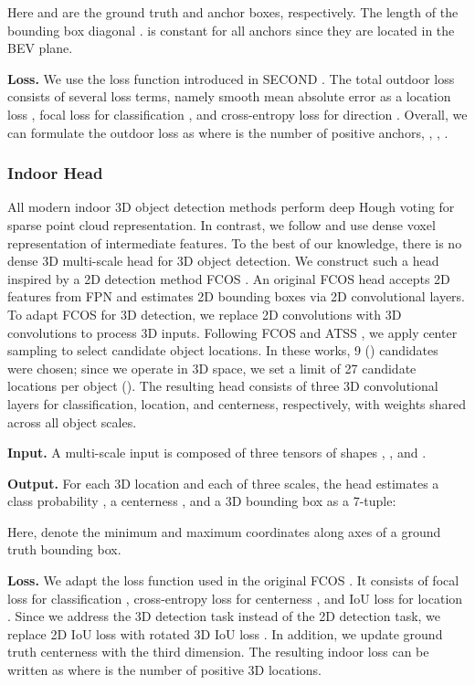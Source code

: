 \documentclass[10pt,twocolumn,letterpaper]{article}
\begin{document}
Here  and  are the ground truth and anchor boxes, respectively. The length of the bounding box diagonal .  is constant for all anchors since they are located in the BEV plane.

\textbf{Loss.} We use the loss function introduced in SECOND \cite{yan2018second}. The total outdoor loss consists of several loss terms, namely smooth mean absolute error as a location loss , focal loss for classification , and cross-entropy loss for direction . Overall, we can formulate the outdoor loss as 
where  is the number of positive anchors, , , .

\subsubsection{Indoor Head} \label{sec:indoor}

All modern indoor 3D object detection methods \cite{qi2019votenet, qi2020imvotenet, zhang2020h3dnet} perform deep Hough voting for sparse point cloud representation. In contrast, we follow \cite{murez2020atlas, hou20193dsis} and use dense voxel representation of intermediate features. To the best of our knowledge, there is no dense 3D multi-scale head for 3D object detection. We construct such a head inspired by a 2D detection method FCOS \cite{tian2019fcos}. An original FCOS head accepts 2D features from FPN and estimates 2D bounding boxes via 2D convolutional layers. To adapt FCOS for 3D detection, we replace 2D convolutions with 3D convolutions to process 3D inputs. Following FCOS and ATSS \cite{zhang2020atss}, we apply center sampling to select candidate object locations. In these works, 9 () candidates were chosen; since we operate in 3D space, we set a limit of 27 candidate locations per object (). The resulting head consists of three 3D convolutional layers for classification, location, and centerness, respectively, with weights shared across all object scales.

\textbf{Input.} A multi-scale input is composed of three tensors of shapes , , and . 

\textbf{Output.} For each 3D location  and each of three scales, the head estimates a class probability , a centerness , and a 3D bounding box as a 7-tuple:



Here,  denote the minimum and maximum coordinates along axes of a ground truth bounding box.

\textbf{Loss.} We adapt the loss function used in the original FCOS \cite{tian2019fcos}. It consists of focal loss for classification , cross-entropy loss for centerness , and IoU loss for location . Since we address the 3D detection task instead of the 2D detection task, we replace 2D IoU loss with rotated 3D IoU loss \cite{zhou2019iou}. In addition, we update ground truth centerness with the third dimension.
The resulting indoor loss can be written as 
where  is the number of positive 3D locations.
\end{document}
